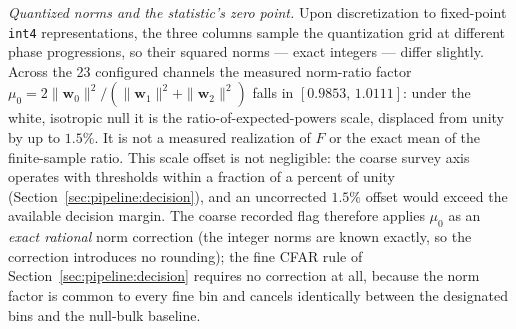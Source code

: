 \textit{Quantized norms and the statistic's zero point.} Upon discretization to fixed-point \texttt{int4} representations, the three columns sample the quantization grid at different phase progressions, so their squared norms --- exact integers --- differ slightly. Across the 23 configured channels the measured norm-ratio factor $\mu_0 = 2\|\mathbf{w}_0\|^2 / (\|\mathbf{w}_1\|^2 + \|\mathbf{w}_2\|^2)$ falls in $[0.9853,\, 1.0111]$: under the white, isotropic null it is the ratio-of-expected-powers scale, displaced from unity by up to $1.5\%$. It is not a measured realization of $F$ or the exact mean of the finite-sample ratio. This scale offset is not negligible: the coarse survey axis operates with thresholds within a fraction of a percent of unity (Section~\ref{sec:pipeline:decision}), and an uncorrected $1.5\%$ offset would exceed the available decision margin. The coarse recorded flag therefore applies $\mu_0$ as an \emph{exact rational} norm correction (the integer norms are known exactly, so the correction introduces no rounding); the fine CFAR rule of Section~\ref{sec:pipeline:decision} requires no correction at all, because the norm factor is common to every fine bin and cancels identically between the designated bins and the null-bulk baseline.
